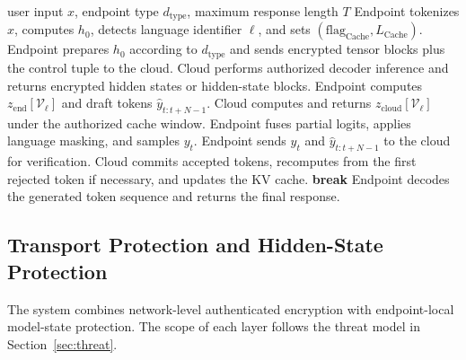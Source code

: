 \documentclass{article}
\newcommand{\Cache}{\mathrm{Cache}}
\newcommand{\End}{\mathrm{end}}
\newcommand{\Cloud}{\mathrm{cloud}}
\begin{document}
\begin{algorithm}[H]
\caption{Endpoint-authorized collaborative decoding}
\label{alg:collab}
\begin{algorithmic}[1]
\Require user input $x$, endpoint type $d_{\mathrm{type}}$, maximum response length $T$
\State Endpoint tokenizes $x$, computes $h_0$, detects language identifier $\ell$, and sets $(\mathrm{flag}_{\Cache},L_{\Cache})$.
\State Endpoint prepares $h_0$ according to $d_{\mathrm{type}}$ and sends encrypted tensor blocks plus the control tuple to the cloud.
\State Cloud performs authorized decoder inference and returns encrypted hidden states or hidden-state blocks.
  \State Endpoint computes $z_{\End}[\mathcal{V}_{\ell}]$ and draft tokens $\hat{y}_{t:t+N-1}$.
  \State Cloud computes and returns $z_{\Cloud}[\mathcal{V}_{\ell}]$ under the authorized cache window.
  \State Endpoint fuses partial logits, applies language masking, and samples $y_t$.
  \State Endpoint sends $y_t$ and $\hat{y}_{t:t+N-1}$ to the cloud for verification.
  \State Cloud commits accepted tokens, recomputes from the first rejected token if necessary, and updates the KV cache.
   \State \textbf{break} \EndIf
\EndFor
\State Endpoint decodes the generated token sequence and returns the final response.
\end{algorithmic}
\end{algorithm}

\subsection{Transport Protection and Hidden-State Protection}

The system combines network-level authenticated encryption with endpoint-local model-state protection. The scope of each layer follows the threat model in Section~\ref{sec:threat}.
\end{document}
